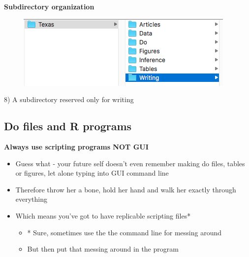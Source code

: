 \documentclass[notes=show]{beamer}
\begin{document}
\begin{frame}[plain]
\begin{center}
\textbf{Subdirectory organization}
\end{center}

\begin{figure}
\includegraphics[scale=0.5]{./lecture_includes/writing.png}
\end{figure}

8) A subdirectory reserved only for writing
\end{frame}


\subsection{Do files and R programs}

\begin{frame}
\begin{center}
\textbf{Always use scripting programs NOT GUI}
\end{center}

\begin{itemize}
\item Guess what - your future self doesn't even remember making do files, tables or figures, let alone typing into GUI command line
\item Therefore throw her a bone, hold her hand and walk her exactly through everything
\item Which means you've got to have replicable scripting files*
	\begin{itemize}
	\item * Sure, sometimes use the the command line for messing around
	\item But then put that messing around in the program
	\end{itemize}
\end{itemize}

\end{frame}
\end{document}
